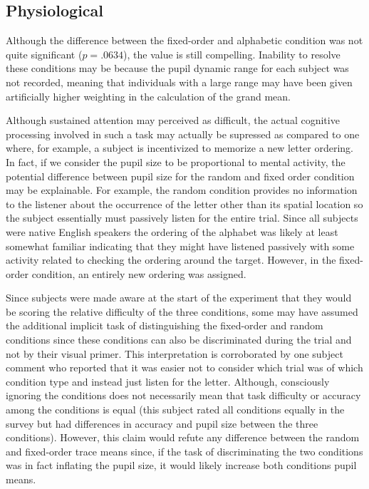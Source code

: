 \documentclass[10pt]{article}
\begin{document}
\subsection{Physiological}
Although the difference between the fixed-order and alphabetic
condition was not quite significant ($p=.0634$), the value is
still compelling.  Inability to resolve these conditions may be
because the
pupil dynamic range for each subject was not recorded, meaning that
individuals with a large range may have been given artificially higher
weighting in the calculation of the grand mean.

Although sustained attention may perceived as difficult, the
actual cognitive processing involved in such a task may
actually be supressed as compared to one where, for example, a
subject is incentivized to memorize a new letter ordering.  In
fact, if we consider the pupil size to be proportional to
mental activity, the potential difference between pupil size
for the random and fixed order condition may be explainable.
For example, the random condition provides no information to
the listener about the occurrence of the letter other than its
spatial location so the subject essentially must passively
listen for the entire trial.  Since all subjects were native
English speakers the ordering of the alphabet was likely at
least somewhat familiar indicating that they might have listened passively
with some activity related to checking the ordering around the
target.  However, in the fixed-order condition, an entirely new ordering
was assigned.  

Since subjects were made aware at the start of the experiment that
they would be scoring the relative difficulty of the three
conditions, some may have assumed the additional implicit task of
distinguishing the fixed-order and random conditions since these
conditions can also be discriminated during the trial and not by
their visual primer.  
This interpretation is corroborated by
one subject comment who reported that it was easier
not to consider which trial was of which condition type and
instead just listen for the letter.  Although, consciously
ignoring the conditions does not necessarily mean that task
difficulty or accuracy among the conditions is equal (this
subject rated all conditions equally in the survey but had
differences in accuracy and pupil size between the three
conditions).
However, this claim would refute any
difference between the random and fixed-order trace means since, if
the task of discriminating the two conditions was in fact inflating
the pupil size, it would likely increase both conditions pupil
means. 
\end{document}
